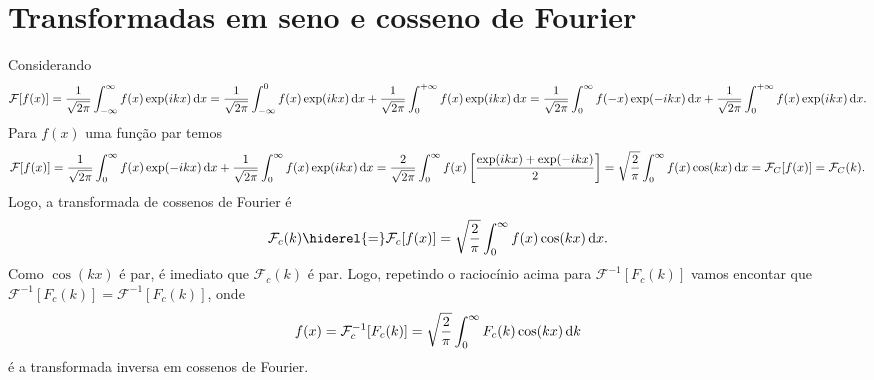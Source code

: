 \section{Transformadas em seno e cosseno de Fourier}
Considerando
\begin{dmath*}
  \mathcal{F}[f(x)] = \frac{1}{\sqrt{2 \pi}} \int_{-\infty}^{\infty} f(x) \exp(i
  k x) \vi{x}
  = \frac{1}{\sqrt{2 \pi}} \int_{-\infty}^0 f(x) \exp(i k x) \vi{x} +
  \frac{1}{\sqrt{2 \pi}} \int_0^{+\infty} f(x) \exp(i k x) \vi{x}
  = \frac{1}{\sqrt{2 \pi}} \int_0^{\infty} f(-x) \exp(-i k x) \vi{x} +
  \frac{1}{\sqrt{2 \pi}} \int_0^{+\infty} f(x) \exp(i k x) \vi{x}.
\end{dmath*}
Para $f(x)$ uma função par temos
\begin{dmath*}
  \mathcal{F}[f(x)] = \frac{1}{\sqrt{2 \pi}} \int_0^{\infty} f(x) \exp(-i k x)
  \vi{x} + \frac{1}{\sqrt{2 \pi}} \int_0^{\infty} f(x) \exp(i k x) \vi{x}
  = \frac{2}{\sqrt{2 \pi}} \int_0^{\infty} f(x) \left[ \frac{\exp(i k x) +
  \exp(-i kx)}{2} \right]
  = \sqrt{\frac{2}{\pi}} \int_0^{\infty} f(x) \cos(k x) \vi{x}
  = \mathcal{F}_C[f(x)]
  = \mathcal{F}_C(k).
\end{dmath*}
Logo, a transformada de cossenos de Fourier é
\begin{dmath*}
  \mathcal{F}_c(k) \hiderel{=} \mathcal{F}_c[f(x)] = \sqrt{\frac{2}{\pi}}
  \int_0^{\infty} f(x) \cos(k x) \vi{x}.
\end{dmath*}
Como $\cos(k x)$ é par, é imediato que $\mathcal{F}_c(k)$ é par. Logo, repetindo
o raciocínio acima para $\mathcal{F}^{-1}[F_c(k)]$ vamos encontar que
$\mathcal{F}^{-1}[F_c(k)] = \mathcal{F}^{-1}[F_c(k)]$, onde
\begin{dmath*}
  f(x) = \mathcal{F}^{-1}_c[F_c(k)]
  = \sqrt{\frac{2}{\pi}} \int_0^{\infty} F_c(k) \cos(k x) \vi{k}
\end{dmath*}
é a transformada inversa em cossenos de Fourier.

